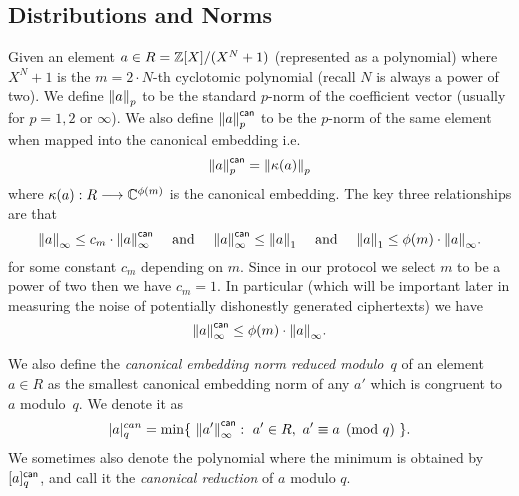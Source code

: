 \subsection{Distributions and Norms}
Given an element $a \in R = {\mathbb{Z}}[X]/(X^{N}+1)$ (represented as a polynomial)
where $X^N+1$ is the $m=2 \cdot N$-th cyclotomic polynomial
(recall $N$ is always a power of two).
We define ${\Vert a \Vert}_p$ to be the standard $p$-norm
of the coefficient vector (usually for $p=1, 2$ or $\infty$).
We also define ${\Vert a \Vert}_p^{\mathsf{can}}$ to be the $p$-norm 
of the same element when mapped into the canonical embedding
i.e.
\[  {\Vert a \Vert}_p^{\mathsf{can}} = {\Vert \kappa(a) \Vert}_p \]
where $\kappa(a): R \longrightarrow \mathbb{C}^{\phi(m)}$ is the
canonical embedding.
The key three relationships are that 
\[ {\Vert a \Vert}_\infty \le c_m \cdot {\Vert a \Vert}_\infty^{\mathsf{can}} \quad
   \mbox{  and  } \quad
   {\Vert a \Vert}_\infty^{\mathsf{can}} \le {\Vert a \Vert}_1  \quad
   \mbox{  and  } \quad
   {\Vert a \Vert}_1 \le \phi(m) \cdot {\Vert a \Vert}_\infty.
\]
for some constant $c_m$ depending on $m$.
Since in our protocol we select $m$ to be a power of two then we have $c_m=1$.
In particular (which will be important later in measuring the
noise of potentially dishonestly generated ciphertexts) we have
\[ {\Vert a \Vert}_{\infty}^{\mathsf{can}} \le \phi(m) \cdot {\Vert a \Vert}_{\infty}. \]

We also define the \emph{canonical embedding norm reduced modulo~$q$} 
of an element $a\in R$ as the smallest canonical embedding norm of any
$a'$ which is congruent to $a$ modulo~$q$. We denote it as
\[
|a|_q^{can} = \min
  \{~{\Vert a' \Vert}_\infty^{\mathsf{can}} :~ a'\in R,~ a' \equiv a \pmod{q}~\}.
\]
We sometimes also denote the polynomial where the minimum is obtained
by $[a]_q^{\mathsf{can}}$, and call it the {\em canonical reduction} of
$a$ modulo $q$. 

